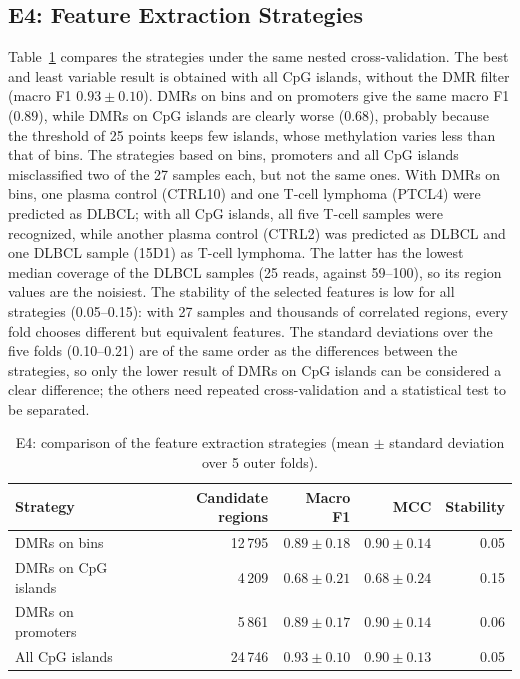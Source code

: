 \documentclass[runningheads]{llncs}
\begin{document}
\subsection{E4: Feature Extraction Strategies}
Table~\ref{tab:e4} compares the strategies under the same nested cross-validation. The best and least variable result is obtained with all CpG islands, without the DMR filter (macro F1 $0.93\pm0.10$). DMRs on bins and on promoters give the same macro F1 ($0.89$), while DMRs on CpG islands are clearly worse ($0.68$), probably because the threshold of 25 points keeps few islands, whose methylation varies less than that of bins. The strategies based on bins, promoters and all CpG islands misclassified two of the 27 samples each, but not the same ones. With DMRs on bins, one plasma control (CTRL10) and one T-cell lymphoma (PTCL4) were predicted as DLBCL; with all CpG islands, all five T-cell samples were recognized, while another plasma control (CTRL2) was predicted as DLBCL and one DLBCL sample (15D1) as T-cell lymphoma. The latter has the lowest median coverage of the DLBCL samples (25 reads, against 59--100), so its region values are the noisiest. The stability of the selected features is low for all strategies (0.05--0.15): with 27 samples and thousands of correlated regions, every fold chooses different but equivalent features. The standard deviations over the five folds (0.10--0.21) are of the same order as the differences between the strategies, so only the lower result of DMRs on CpG islands can be considered a clear difference; the others need repeated cross-validation and a statistical test to be separated.

\begin{table}[!htb]
\centering
\caption{E4: comparison of the feature extraction strategies (mean $\pm$ standard deviation over 5 outer folds).}
\label{tab:e4}
\small
\begin{tabular}{lrrrr}
\toprule
Strategy & Candidate regions & Macro F1 & MCC & Stability \\
\midrule
DMRs on bins & 12\,795 & $0.89\pm0.18$ & $0.90\pm0.14$ & 0.05 \\
DMRs on CpG islands & 4\,209 & $0.68\pm0.21$ & $0.68\pm0.24$ & 0.15 \\
DMRs on promoters & 5\,861 & $0.89\pm0.17$ & $0.90\pm0.14$ & 0.06 \\
All CpG islands & 24\,746 & $0.93\pm0.10$ & $0.90\pm0.13$ & 0.05 \\
\bottomrule
\end{tabular}
\end{table}
\end{document}
